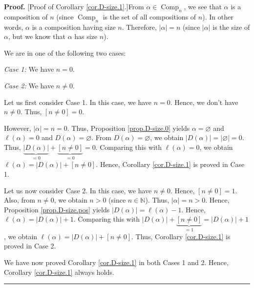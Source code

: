 \documentclass[numbers=enddot,12pt,final,onecolumn,notitlepage]{scrartcl}%
\theoremstyle{definition}
\newenvironment{proof}[1][Proof]{\noindent\textbf{#1.} }{\ \rule{0.5em}{0.5em}}
\begin{document}
\begin{proof}
[Proof of Corollary \ref{cor.D-size.1}.]From $\alpha\in\operatorname*{Comp}%
\nolimits_{n}$, we see that $\alpha$ is a composition of $n$ (since
$\operatorname*{Comp}\nolimits_{n}$ is the set of all compositions of $n$). In
other words, $\alpha$ is a composition having size $n$. Therefore, $\left\vert
\alpha\right\vert =n$ (since $\left\vert \alpha\right\vert $ is the size of
$\alpha$, but we know that $\alpha$ has size $n$).

We are in one of the following two cases:

\textit{Case 1:} We have $n=0$.

\textit{Case 2:} We have $n\neq0$.

Let us first consider Case 1. In this case, we have $n=0$. Hence, we don't
have $n\neq0$. Thus, $\left[  n\neq0\right]  =0$.

However, $\left\vert \alpha\right\vert =n=0$. Thus, Proposition
\ref{prop.D-size.0} yields $\alpha=\varnothing$ and $\ell\left(
\alpha\right)  =0$ and $D\left(  \alpha\right)  =\varnothing$. From $D\left(
\alpha\right)  =\varnothing$, we obtain $\left\vert D\left(  \alpha\right)
\right\vert =\left\vert \varnothing\right\vert =0$. Thus,
$\underbrace{\left\vert D\left(  \alpha\right)  \right\vert }_{=0}%
+\underbrace{\left[  n\neq0\right]  }_{=0}=0$. Comparing this with
$\ell\left(  \alpha\right)  =0$, we obtain $\ell\left(  \alpha\right)
=\left\vert D\left(  \alpha\right)  \right\vert +\left[  n\neq0\right]  $.
Hence, Corollary \ref{cor.D-size.1} is proved in Case 1.

Let us now consider Case 2. In this case, we have $n\neq0$. Hence, $\left[
n\neq0\right]  =1$. Also, from $n\neq0$, we obtain $n>0$ (since $n\in
\mathbb{N}$). Thus, $\left\vert \alpha\right\vert =n>0$. Hence, Proposition
\ref{prop.D-size.pos} yields $\left\vert D\left(  \alpha\right)  \right\vert
=\ell\left(  \alpha\right)  -1$. Hence, $\ell\left(  \alpha\right)
=\left\vert D\left(  \alpha\right)  \right\vert +1$. Comparing this with
$\left\vert D\left(  \alpha\right)  \right\vert +\underbrace{\left[
n\neq0\right]  }_{=1}=\left\vert D\left(  \alpha\right)  \right\vert +1$, we
obtain $\ell\left(  \alpha\right)  =\left\vert D\left(  \alpha\right)
\right\vert +\left[  n\neq0\right]  $. Thus, Corollary \ref{cor.D-size.1} is
proved in Case 2.

We have now proved Corollary \ref{cor.D-size.1} in both Cases 1 and 2. Hence,
Corollary \ref{cor.D-size.1} always holds.
\end{proof}
\end{document}
